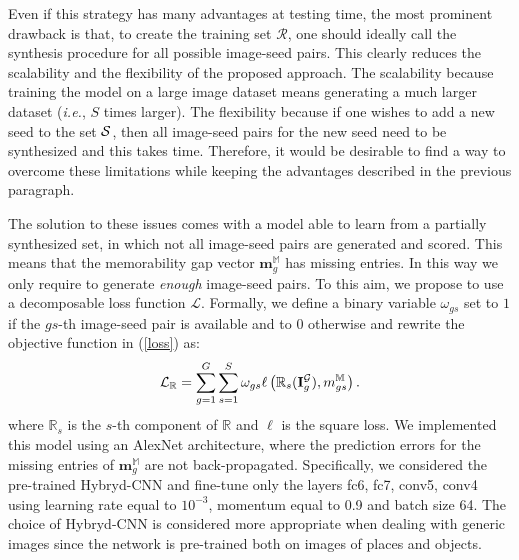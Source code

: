 \documentclass{sig-alternate-05-2015}
\begin{document}
Even if this strategy has many advantages at testing time, the most prominent drawback is that, to create the training set $\mathcal{R}$, one should ideally call the synthesis procedure for all possible image-seed pairs. This clearly reduces the scalability and the flexibility of the proposed approach. The scalability because training the model on a large image dataset means generating a much larger dataset (\textit{i.e.}, $S$ times larger). The flexibility because if one wishes to add a new seed to the set ${\cal S}$, then all image-seed pairs for the new seed need to be synthesized and this takes time. Therefore, it would be desirable to find a way to overcome these limitations while keeping the advantages described in the previous paragraph.

The solution to these issues comes with a model able to learn from a partially synthesized set, in which not all image-seed pairs are generated and scored. This means that the memorability gap vector $\mathbf{m}^{\mathbb M}_g$ has  missing entries. In this way we only require to generate \textit{enough} image-seed pairs. To this aim, we propose to use a decomposable loss function $\mathcal{L}$. Formally, we define a binary variable $\omega_{gs}$ set to $1$ if the 
$gs$-th image-seed pair is available and to $0$ otherwise and rewrite the objective function in (\ref{loss}) as:
\begin{equation}{\cal L}_\mathbb{R} = \sum_{g=1}^G \sum_{s=1}^S \omega_{gs}\ell\left(\mathbb{R}_s(\mathbf{I}_g^{\cal G}),m_{gs}^\mathbb{M}\right).
\end{equation}
where $\mathbb{R}_s$ is the $s$-th component of $\mathbb{R}$ and $\ell$ is the square loss.
We implemented this model using an AlexNet architecture, where the prediction errors for the missing entries of $\mathbf{m}^{\mathbb{M}}_g$ are not back-propagated. 
Specifically, we considered the pre-trained Hybryd-CNN and fine-tune only the layers fc6, fc7, conv5, conv4 using learning rate equal to $10^{-3}$, momentum equal to 0.9 and batch size 64. The choice of  Hybryd-CNN is considered more appropriate when dealing with generic images since the network is pre-trained both on images of places and objects.
\end{document}
